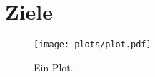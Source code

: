 \section{Ziele}
\label{sec:ziele}
\begin{figure}
    \centering
    \texttt{[image: plots/plot.pdf]}
    \caption{Ein Plot.}
    \label{fig:Plot}
\end{figure}